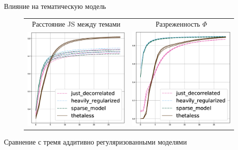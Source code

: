 \begin{frame}{Влияние на тематическую модель}

\begin{figure}
\setlength\tabcolsep{0pt} %
\begin{tabular}{cc}
Расстояние JS между темами & Разреженность $\Phi$\\
\includegraphics[width=54mm]{images/CH4_vs_regularized_diversity_jensenshannon_False.eps} &
\includegraphics[width=54mm]{images/CH4_vs_regularized_SparsityPhiScore.eps} \end{tabular}
\end{figure}
Сравнение с тремя аддитивно регуляризованными моделями
\end{frame}

